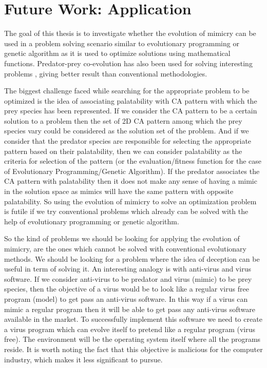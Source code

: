 \chapter{Future Work: Application}
\label{chapter:application}

The goal of this thesis is to investigate whether the evolution of mimicry can be used in a problem solving scenario similar to evolutionary programming or genetic algorithm as it is used to optimize solutions using mathematical functions. Predator-prey co-evolution has also been used for solving interesting problems \cite{hillis1990}, giving better result than conventional methodologies. 

The biggest challenge faced while searching for the appropriate problem to be optimized is the idea of associating palatability with CA pattern with which the prey species has been represented. If we consider the CA pattern to be a certain solution to a problem then the set of 2D CA pattern among which the prey species vary could be considered as the solution set of the problem. And if we consider that the predator species are responsible for selecting the appropriate pattern based on their palatability, then we can consider palatability as the criteria for selection of the pattern (or the evaluation/fitness function for the case of Evolutionary Programming/Genetic Algorithm). If the predator associates the CA pattern with palatability then it does not make any sense of having a mimic in the solution space as mimics will have the same pattern with opposite palatability. So using the evolution of mimicry to solve an optimization problem is futile if we try conventional problems which already can be solved with the help of evolutionary programming or genetic algorithm. 

So the kind of problems we should be looking for applying the evolution of mimicry, are the ones which cannot be solved with conventional evolutionary methods. We should be looking for a problem where the idea of deception can be useful in term of solving it. An interesting analogy is with anti-virus and virus software. If we consider anti-virus to be predator and virus (mimic) to be prey species, then the objective of a virus would be to look like a regular virus free program (model) to get pass an anti-virus software. In this way if a virus can mimic a regular program then it will be able to get pass any anti-virus software available in the market. To successfully implement this software we need to create a virus program which can evolve itself to pretend like a regular program (virus free). The environment will be the operating system itself where all the programs reside. It is worth noting the fact that this objective is malicious for the computer industry, which makes it less significant to pursue. 